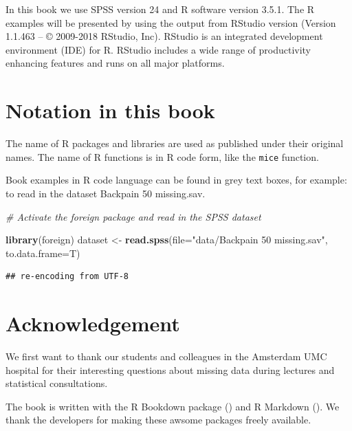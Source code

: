 \documentclass[
]{book}
\newenvironment{Shaded}{\begin{snugshade}}{\end{snugshade}}
\newcommand{\CommentTok}[1]{\textcolor[rgb]{0.56,0.35,0.01}{\textit{#1}}}
\newcommand{\DataTypeTok}[1]{\textcolor[rgb]{0.13,0.29,0.53}{#1}}
\newcommand{\KeywordTok}[1]{\textcolor[rgb]{0.13,0.29,0.53}{\textbf{#1}}}
\newcommand{\NormalTok}[1]{#1}
\newcommand{\StringTok}[1]{\textcolor[rgb]{0.31,0.60,0.02}{#1}}
\begin{document}
In this book we use SPSS version 24 and R software version 3.5.1. The R examples will be presented by using the output from RStudio version (Version 1.1.463 -- © 2009-2018 RStudio, Inc). RStudio is an integrated development environment (IDE) for R. RStudio includes a wide range of productivity enhancing features and runs on all major platforms.

\hypertarget{notation-in-this-book}{%
\section*{Notation in this book}\label{notation-in-this-book}}

The name of R packages and libraries are used as published under their original names. The name of R functions is in R code form, like the \texttt{mice} function.

Book examples in R code language can be found in grey text boxes, for example:
to read in the dataset Backpain 50 missing.sav.

\begin{Shaded}
\begin{Highlighting}[]
\CommentTok{# Activate the foreign package and read in the SPSS dataset}

\KeywordTok{library}\NormalTok{(foreign)}
\NormalTok{dataset <-}\StringTok{ }\KeywordTok{read.spss}\NormalTok{(}\DataTypeTok{file=}\StringTok{"data/Backpain 50 missing.sav"}\NormalTok{, }\DataTypeTok{to.data.frame=}\NormalTok{T)}
\end{Highlighting}
\end{Shaded}

\begin{verbatim}
## re-encoding from UTF-8
\end{verbatim}

\hypertarget{acknowledgement}{%
\section*{Acknowledgement}\label{acknowledgement}}

We first want to thank our students and colleagues in the Amsterdam UMC hospital for their interesting questions about missing data during lectures and statistical consultations.

The book is written with the R Bookdown package (\citet{R-bookdown}) and R Markdown (\citet{R-rmarkdown}). We thank the developers for making these awsome packages freely available.
\end{document}
